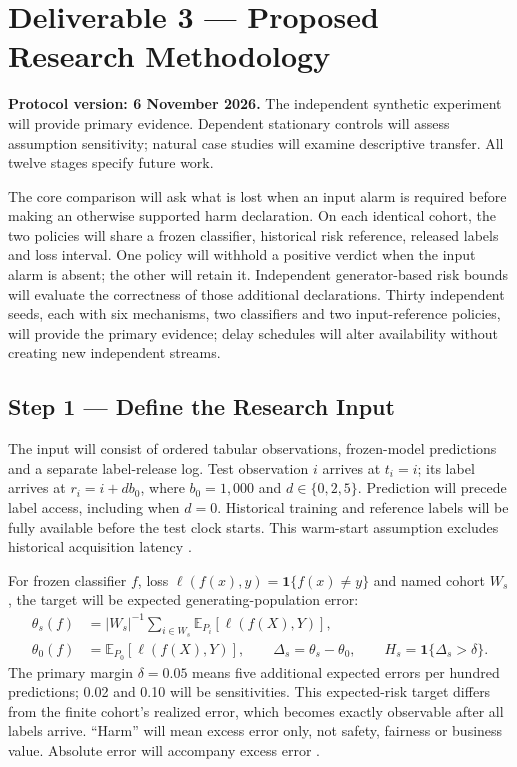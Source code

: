 \documentclass[11pt,a4paper]{article}
\newcommand{\ind}{\mathbf{1}}
\begin{document}
\section*{Deliverable 3 --- Proposed Research Methodology}
\textbf{Protocol version: 6 November 2026.}
The independent synthetic experiment will provide primary evidence. Dependent
stationary controls will assess assumption sensitivity; natural case studies
will examine descriptive transfer. All twelve stages specify future work.

The core comparison will ask what is lost when an input alarm is required
before making an otherwise supported harm declaration. On each identical
cohort, the two policies will share a frozen classifier, historical risk
reference, released labels and loss interval. One policy will withhold a
positive verdict when the input alarm is absent; the other will retain it.
Independent generator-based risk bounds will evaluate the correctness of
those additional declarations. Thirty independent seeds, each with six
mechanisms, two classifiers and two input-reference policies, will provide
the primary evidence; delay schedules will alter availability without
creating new independent streams.

\subsection*{Step 1 --- Define the Research Input}
The input will consist of ordered tabular observations, frozen-model predictions
and a separate label-release log. Test observation $i$ arrives at $t_i=i$;
its label arrives at $r_i=i+db_0$, where $b_0=1{,}000$ and
$d\in\{0,2,5\}$. Prediction will precede label access, including when $d=0$.
Historical training and reference labels will be fully available before the
test clock starts. This warm-start assumption excludes historical acquisition
latency \cite{souza,alencar}.

For frozen classifier $f$, loss $\ell(f(x),y)=\ind\{f(x)\ne y\}$ and named
cohort $W_s$, the target will be expected generating-population error:
\begin{align}
\theta_s(f)&=|W_s|^{-1}\sum_{i\in W_s}\mathbb E_{P_i}[\ell(f(X),Y)],\\
\theta_0(f)&=\mathbb E_{P_0}[\ell(f(X),Y)],\qquad
\Delta_s=\theta_s-\theta_0,\qquad H_s=\ind\{\Delta_s>\delta\}.
\end{align}
The primary margin $\delta=0.05$ means five additional expected errors per
hundred predictions; 0.02 and 0.10 will be sensitivities. This expected-risk
target differs from the finite cohort's realized error, which becomes exactly
observable after all labels arrive. ``Harm'' will mean excess error only, not
safety, fairness or business value. Absolute error will accompany excess error
\cite{hoeffding,nist}.
\end{document}
